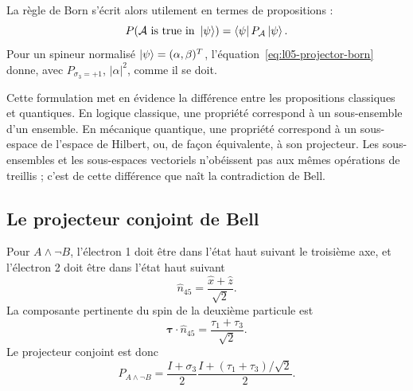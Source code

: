 \begin{classroomqa}
\end{classroomqa}

La règle de Born s’écrit alors utilement en termes de propositions :
\begin{equation}
  P(\mathcal A\text{ is true in }\left\lvert\psi\right\rangle)
  =
  \left\langle\psi\right\rvert P_{\mathcal A}\left\lvert\psi\right\rangle.
  \label{eq:l05-projector-born}
\end{equation}
Pour un spineur normalisé \(\left\lvert\psi\right\rangle=(\alpha,\beta)^T\), l’équation~\eqref{eq:l05-projector-born} donne, avec \(P_{\sigma_3=+1}\), \(|\alpha|^2\), comme il se doit.

Cette formulation met en évidence la différence entre les propositions classiques et quantiques. En logique classique, une propriété correspond à un sous-ensemble d’un ensemble. En mécanique quantique, une propriété correspond à un sous-espace de l’espace de Hilbert, ou, de façon équivalente, à son projecteur. Les sous-ensembles et les sous-espaces vectoriels n’obéissent pas aux mêmes opérations de treillis ; c’est de cette différence que naît la contradiction de Bell.

\subsection{Le projecteur conjoint de Bell}

Pour \(A\wedge\neg B\), l’électron 1 doit être dans l’état haut suivant le troisième axe, et l’électron 2 doit être dans l’état haut suivant
\begin{equation}
  \hat n_{45}=\frac{\hat x+\hat z}{\sqrt2}.
\end{equation}
La composante pertinente du spin de la deuxième particule est
\begin{equation}
  \boldsymbol{\tau}\cdot\hat n_{45}
  =
  \frac{\tau_1+\tau_3}{\sqrt2}.
\end{equation}
Le projecteur conjoint est donc
\begin{equation}
  P_{A\wedge\neg B}
  =
  \frac{I+\sigma_3}{2}
  \frac{I+(\tau_1+\tau_3)/\sqrt2}{2}.
  \label{eq:l05-joint-projector}
\end{equation}

\begin{classroomqa}
\end{classroomqa}

